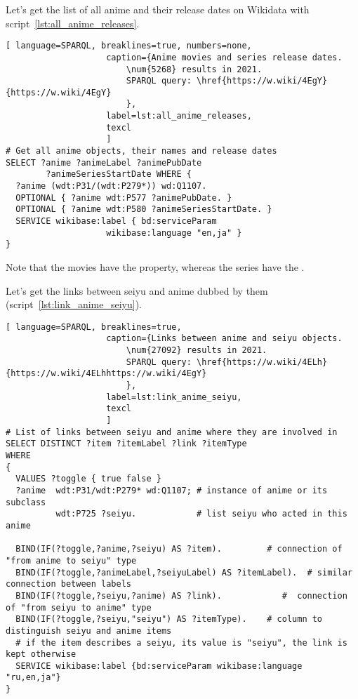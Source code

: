 Let's get the list of all anime and their release dates on Wikidata with script~\ref{lst:all_anime_releases}.

\begin{lstlisting}[ language=SPARQL, breaklines=true, numbers=none,
                    caption={Anime movies and series release dates.
                        \num{5268} results in 2021.
                        SPARQL query: \href{https://w.wiki/4EgY}{https://w.wiki/4EgY}
                        },
                    label=lst:all_anime_releases,
                    texcl 
                    ]
# Get all anime objects, their names and release dates
SELECT ?anime ?animeLabel ?animePubDate
		?animeSeriesStartDate WHERE {
  ?anime (wdt:P31/(wdt:P279*)) wd:Q1107.
  OPTIONAL { ?anime wdt:P577 ?animePubDate. }
  OPTIONAL { ?anime wdt:P580 ?animeSeriesStartDate. }
  SERVICE wikibase:label { bd:serviceParam
					wikibase:language "en,ja" }
}
\end{lstlisting}%

Note that the movies have the  property, whereas the series have the .

Let's get the links between seiyu and anime dubbed by them (script~\ref{lst:link_anime_seiyu}).

\begin{widepar}
\begin{lstlisting}[ language=SPARQL, breaklines=true,
                    caption={Links between anime and seiyu objects.
                        \num{27092} results in 2021.
                        SPARQL query: \href{https://w.wiki/4ELh}{https://w.wiki/4ELhhttps://w.wiki/4EgY}
                        },
                    label=lst:link_anime_seiyu,
                    texcl 
                    ]
# List of links between seiyu and anime where they are involved in
SELECT DISTINCT ?item ?itemLabel ?link ?itemType
WHERE
{
  VALUES ?toggle { true false }
  ?anime  wdt:P31/wdt:P279* wd:Q1107; # instance of anime or its subclass
          wdt:P725 ?seiyu.            # list seiyu who acted in this anime
  
  BIND(IF(?toggle,?anime,?seiyu) AS ?item).         # connection of "from anime to seiyu" type
  BIND(IF(?toggle,?animeLabel,?seiyuLabel) AS ?itemLabel).  # similar connection between labels
  BIND(IF(?toggle,?seiyu,?anime) AS ?link).            #  connection of "from seiyu to anime" type
  BIND(IF(?toggle,?seiyu,"seiyu") AS ?itemType).    # column to distinguish seiyu and anime items
  # if the item describes a seiyu, its value is "seiyu", the link is kept otherwise
  SERVICE wikibase:label {bd:serviceParam wikibase:language "ru,en,ja"}
}
\end{lstlisting}%
\end{widepar}

